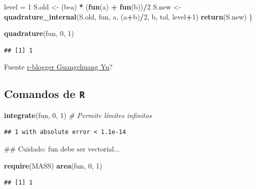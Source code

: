 \documentclass[]{book}
\newenvironment{Shaded}{\begin{snugshade}}{\end{snugshade}}
\newcommand{\KeywordTok}[1]{\textcolor[rgb]{0.13,0.29,0.53}{\textbf{#1}}}
\newcommand{\DecValTok}[1]{\textcolor[rgb]{0.00,0.00,0.81}{#1}}
\newcommand{\StringTok}[1]{\textcolor[rgb]{0.31,0.60,0.02}{#1}}
\newcommand{\CommentTok}[1]{\textcolor[rgb]{0.56,0.35,0.01}{\textit{#1}}}
\newcommand{\OperatorTok}[1]{\textcolor[rgb]{0.81,0.36,0.00}{\textbf{#1}}}
\newcommand{\NormalTok}[1]{#1}
\theoremstyle{definition}
\theoremstyle{definition}
\theoremstyle{definition}
\theoremstyle{remark}
\begin{document}
\begin{Shaded}
\begin{Highlighting}[]
\NormalTok{    level =}\StringTok{ }\DecValTok{1}
\NormalTok{    S.old <-}\StringTok{ }\NormalTok{(b}\OperatorTok{-}\NormalTok{a) }\OperatorTok{*}\StringTok{ }\NormalTok{(}\KeywordTok{fun}\NormalTok{(a) }\OperatorTok{+}\StringTok{ }\KeywordTok{fun}\NormalTok{(b))}\OperatorTok{/}\DecValTok{2}
\NormalTok{    S.new <-}\StringTok{ }\KeywordTok{quadrature_internal}\NormalTok{(S.old, fun, }
\NormalTok{                                 a, (a}\OperatorTok{+}\NormalTok{b)}\OperatorTok{/}\DecValTok{2}\NormalTok{, b, tol, level}\OperatorTok{+}\DecValTok{1}\NormalTok{)}
    \KeywordTok{return}\NormalTok{(S.new)}
\NormalTok{\}}

\KeywordTok{quadrature}\NormalTok{(fun, }\DecValTok{0}\NormalTok{, }\DecValTok{1}\NormalTok{)}
\end{Highlighting}
\end{Shaded}

\begin{verbatim}
## [1] 1
\end{verbatim}

Fuente
\href{https://www.r-bloggers.com/one-dimensional-integrals}{r-blogger
Guangchuang Yu}?

\subsection{\texorpdfstring{Comandos de
\texttt{R}}{Comandos de R}}\label{comandos-de-r}

\begin{Shaded}
\begin{Highlighting}[]
\KeywordTok{integrate}\NormalTok{(fun, }\DecValTok{0}\NormalTok{, }\DecValTok{1}\NormalTok{)   }\CommentTok{# Permite límites infinitos  }
\end{Highlighting}
\end{Shaded}

\begin{verbatim}
## 1 with absolute error < 1.1e-14
\end{verbatim}

\begin{Shaded}
\begin{Highlighting}[]
\NormalTok{## Cuidado: fun debe ser vectorial...}

\KeywordTok{require}\NormalTok{(MASS)}
\KeywordTok{area}\NormalTok{(fun, }\DecValTok{0}\NormalTok{, }\DecValTok{1}\NormalTok{)}
\end{Highlighting}
\end{Shaded}

\begin{verbatim}
## [1] 1
\end{verbatim}
\end{document}
